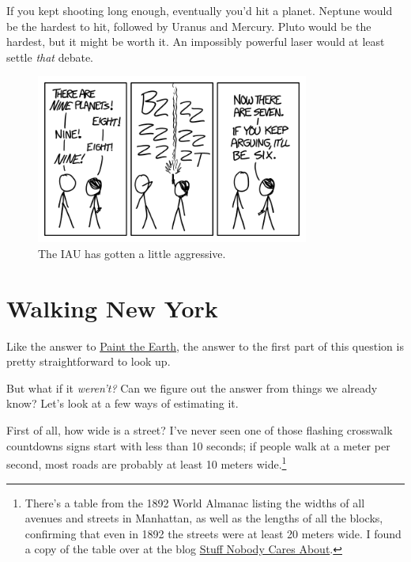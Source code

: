 {{If you kept shooting long enough, eventually you'd hit a planet. Neptune would be the hardest to hit, followed by Uranus and Mercury. Pluto would be the hardest, but it might be worth it. An impossibly powerful laser would at least settle \emph{that} debate.}

\begin{figure}[!htbp]
\centering
\includegraphics[scale=0.5, max width=0.8\textwidth]{imgs/a/109/planet.png}
\caption{The IAU has gotten a little aggressive.}
\end{figure}

{
\chapter{Walking New York}
}

\hfill{}

{Like the answer to \href{http://what-if.xkcd.com/84/}{Paint the Earth}, the answer to the first part of this question is pretty straightforward to look up.}

{But what if it \emph{weren't?} Can we figure out the answer from things we already know? Let's look at a few ways of estimating it.}

{First of all, how wide is a street? I've never seen one of those flashing crosswalk countdowns signs start with less than 10 seconds; if people walk at a meter per second, most roads are probably at least 10 meters wide.{\footnote{There's a table from the 1892 World Almanac listing the widths of all avenues and streets in Manhattan, as well as the lengths of all the blocks, confirming that even in 1892 the streets were at least 20 meters wide. I found a copy of the table over at the blog \href{http://stuffnobodycaresabout.com/2012/11/19/all-new-york-city-streets-are-not-created-equal/}{Stuff Nobody Cares About}.} } }

}
